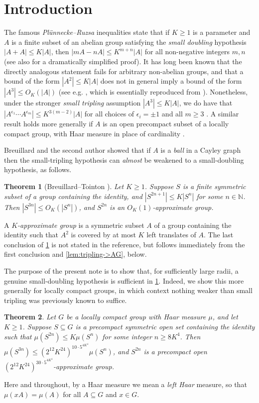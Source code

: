 \documentclass[10pt]{article}
\newcommand{\N}{\mathbb{N}}
\newtheorem{theorem}[theorem]{Theorem}
\begin{document}
\section{Introduction}
The famous \emph{Plünnecke--Ruzsa} inequalities state that if $K\ge1$ is a parameter and $A$ is a finite subset of an abelian group satisfying the \emph{small doubling} hypothesis $|A+A|\le K|A|$, then $|mA-nA|\le K^{m+n}|A|$ for all non-negative integers $m,n$ \cite{plunnecke,ruz.pl.1,ruz.pl.2} (see also \cite{petridis} for a dramatically simplified proof). It has long been known that the directly analogous statement fails for arbitrary non-abelian groups, and that a bound of the form $|A^2|\le K|A|$ does not in general imply a bound of the form $|A^3|\le O_K(|A|)$ (see e.g. \cite[Example 2.5.2]{book}, which is essentially reproduced from \cite{tao.product.set}). Nonetheless, under the stronger \emph{small tripling} assumption $|A^3|\le K|A|$, we do have that $|A^{\epsilon_1}\cdots A^{\epsilon_m}|\le K^{3(m-2)}|A|$ for all choices of $\epsilon_i=\pm1$ and all $m\ge3$ \cite[Proposition 2.5.3]{book}. A similar result holds more generally if $A$ is an open precompact subset of a locally compact group, with Haar measure in place of cardinality \cite[Lemma 3.4]{tao.product.set}.

Breuillard and the second author showed that if $A$ is a \emph{ball} in a Cayley graph then the small-tripling hypothesis can \emph{almost} be weakened to a small-doubling hypothesis, as follows.
\begin{theorem}[Breuillard--Tointon {\cite[Lemma 2.10]{bt}}]\label{lem:bt}
Let $K\ge1$. Suppose $S$ is a finite symmetric subset of a group containing the identity, and $|S^{2n+1}|\le K|S^n|$ for some $n\in\N$. Then $|S^{3n}|\le O_K(|S^n|)$, and $S^{2n}$ is an $O_K(1)$-approximate group.
\end{theorem}
A \emph{$K$-approximate group} is a symmetric subset $A$ of a group containing the identity such that $A^2$ is covered by at most $K$ left translates of $A$. The last conclusion of \cref{lem:bt} is not stated in the reference, but follows immediately from the first conclusion and \cref{lem:tripling->AG}, below.

The purpose of the present note is to show that, for sufficiently large radii, a genuine small-doubling hypothesis is sufficient in \cref{lem:bt}. Indeed, we show this more generally for locally compact groups, in which context nothing weaker than small tripling was previously known to suffice.
\begin{theorem}\label{thm:doubling.lc}
Let $G$ be a locally compact group with Haar measure $\mu$, and let $K\ge1$. Suppose $S\subseteq G$ is a precompact symmetric open set containing the identity such that $\mu(S^{2n})\le K\mu(S^n)$ for some integer $n\ge8K^4$. Then $\mu(S^{3n})\le(2^{12}K^{24})^{10\cdot5^{4K^4}}\mu(S^n)$, and $S^{2n}$ is a precompact open $(2^{12}K^{24})^{30\cdot5^{4K^4}}$-approximate group.
\end{theorem}
Here and throughout, by a Haar measure we mean a \emph{left Haar} measure, so that $\mu(xA)=\mu(A)$ for all $A\subseteq G$ and $x\in G$.
\end{document}
